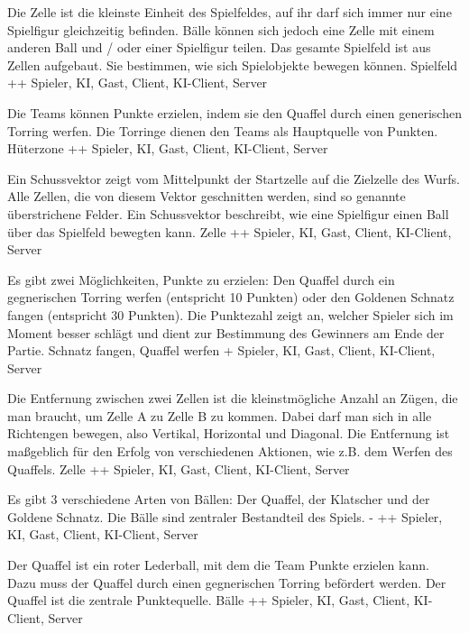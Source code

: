         {Die Zelle ist die kleinste Einheit des Spielfeldes, auf ihr darf sich immer nur eine Spielfigur gleichzeitig befinden. Bälle können sich jedoch eine Zelle mit einem anderen Ball und / oder einer Spielfigur teilen.}
        {Das gesamte Spielfeld ist aus Zellen aufgebaut. Sie bestimmen, wie sich Spielobjekte bewegen können.}
        {Spielfeld}
        {++}
        {Spieler, KI, Gast, Client, KI-Client, Server}

        {Die Teams können Punkte erzielen, indem sie den Quaffel durch einen generischen Torring werfen.}
        {Die Torringe dienen den Teams als Hauptquelle von Punkten.}
        {Hüterzone}
        {++}
        {Spieler, KI, Gast, Client, KI-Client, Server}
        
        {Ein Schussvektor zeigt vom Mittelpunkt der Startzelle auf die Zielzelle des Wurfs. Alle Zellen, die von diesem Vektor geschnitten werden, sind so genannte überstrichene Felder.}
        {Ein Schussvektor beschreibt, wie eine Spielfigur einen Ball über das Spielfeld bewegten kann.}
        {Zelle}
        {++}
        {Spieler, KI, Gast, Client, KI-Client, Server}
        
        {Es gibt zwei Möglichkeiten, Punkte zu erzielen: Den Quaffel durch ein gegnerischen Torring werfen (entspricht 10 Punkten) oder den Goldenen Schnatz fangen (entspricht 30 Punkten).}
        {Die Punktezahl zeigt an, welcher Spieler sich im Moment besser schlägt und dient zur Bestimmung des Gewinners am Ende der Partie.}
        {Schnatz fangen, Quaffel werfen}
        {+}
        {Spieler, KI, Gast, Client, KI-Client, Server}

        {Die Entfernung zwischen zwei Zellen ist die kleinstmögliche Anzahl an Zügen, die man braucht, um Zelle A zu Zelle B zu kommen. Dabei darf  man sich in alle Richtengen bewegen, also Vertikal, Horizontal und Diagonal.}
        {Die Entfernung ist maßgeblich für den Erfolg von verschiedenen Aktionen, wie z.B. dem Werfen des Quaffels.}
        {Zelle}
        {++}
        {Spieler, KI, Gast, Client, KI-Client, Server}

        {Es gibt 3 verschiedene Arten von Bällen: Der Quaffel, der Klatscher und der Goldene Schnatz.}
        {Die Bälle sind zentraler Bestandteil des Spiels.}
        {-}
        {++}
        {Spieler, KI, Gast, Client, KI-Client, Server}

        {Der Quaffel ist ein roter Lederball, mit dem die Team Punkte erzielen kann. Dazu muss der Quaffel durch einen gegnerischen Torring befördert werden.}
        {Der Quaffel ist die zentrale Punktequelle.}
        {Bälle}
        {++}
        {Spieler, KI, Gast, Client, KI-Client, Server}


